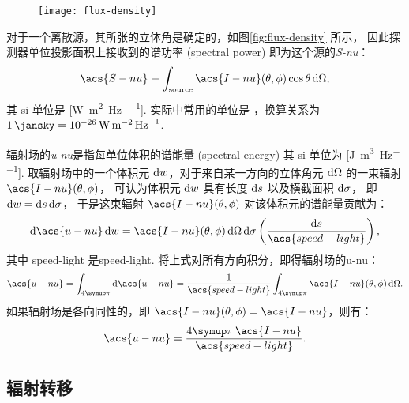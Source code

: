 \begin{figure}[htp]
  \centering
  \texttt{[image: flux-density]}
  \label{fig:flux-density}
\end{figure}

对于一个离散源，其所张的立体角是确定的，如图\autoref{fig:flux-density} 所示，
因此探测器单位投影面积上接收到的谱功率 (spectral power)
即为这个源的\emph{\acf{S-nu}}：
\begin{equation}
  \label{eq:flux-density}
  \acs{S-nu} \equiv
    \int_{\R{source}} \acs{I-nu}(\theta,\phi) \cos\theta \,\D{\Omega} ,
\end{equation}
其 \ac{si} 单位是 [\si{\watt\per\square\meter\per\hertz}].
实际中常用的单位是 \si{\jansky}，换算关系为
$\SI{1}{\jansky} = \SI{e-26}{\watt\per\square\meter\per\hertz}$.

辐射场的\emph{\acf{u-nu}}是指每单位体积的谱能量 (spectral energy)
其 \ac{si} 单位为 [\si{\joule\per\cubic\meter\per\hertz}].
取辐射场中的一个体积元 $\mathrm{d}w$，对于来自某一方向的立体角元 $\mathrm{d}\Omega$
的一束辐射 $\acs{I-nu}(\theta,\phi)$，
可认为体积元 $\mathrm{d}w$ 具有长度 $\mathrm{d}s$ 以及横截面积 $\mathrm{d}\sigma$，
即 $\mathrm{d}w = \mathrm{d}s\,\mathrm{d}\sigma$，
于是这束辐射 $\acs{I-nu}(\theta,\phi)$ 对该体积元的谱能量贡献为：
\begin{equation}
  \D{\acs{u-nu}}\,\D{w}
    = \acs{I-nu}(\theta,\phi) \,\D{\Omega}\,\D{\sigma}
      \left( \frac{\D{s}}{\acs{speed-light}} \right) ,
\end{equation}
其中 \acs{speed-light} 是\acl{speed-light}.
将上式对所有方向积分，即得辐射场的\acl{u-nu}：
\begin{equation}
  \label{eq:spectral-energy-density}
  \acs{u-nu}
    = \int_{4\Cpi} \D{\acs{u-nu}}
    = \frac{1}{\acs{speed-light}}
      \int_{4\Cpi} \acs{I-nu}(\theta,\phi) \,\D{\Omega} .
\end{equation}
如果辐射场是各向同性的，即 $\acs{I-nu}(\theta,\phi) = \acs{I-nu}$，则有：
\begin{equation}
  \label{eq:spectral-energy-density-iso}
  \acs{u-nu} = \frac{4\Cpi \, \acs{I-nu}}{\acs{speed-light}} .
\end{equation}

\subsection{辐射转移}

